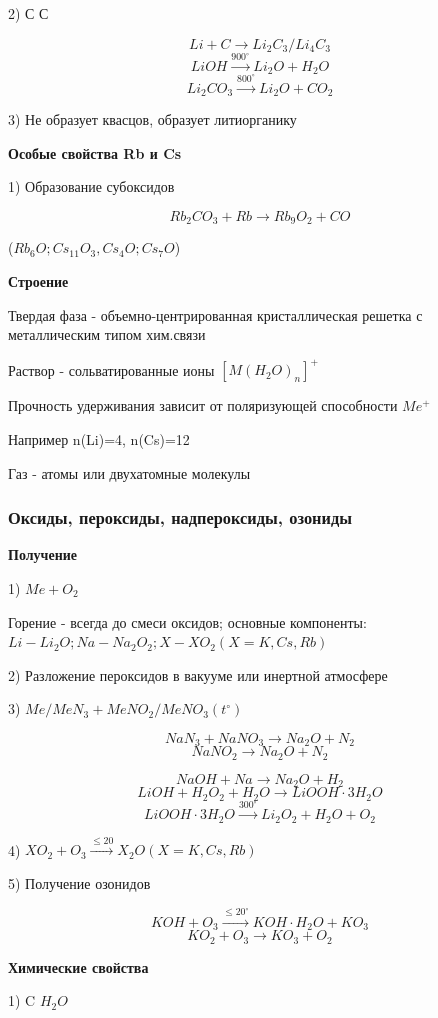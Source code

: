 2) С $С$

$$Li + C \rightarrow Li_2C_3 / Li_4C_3$$
$$LiOH \xrightarrow{900^{\circ}} Li_2O + H_2O$$
$$Li_2CO_3 \xrightarrow{800^{\circ}} Li_2O + CO_2$$

3) Не образует квасцов, образует литиорганику

\textbf{Особые свойства Rb и Cs }

1) Образование субоксидов

$$Rb_2CO_3 + Rb \rightarrow Rb_9O_2 + CO$$

($Rb_6O; Cs_{11}O_3, Cs_4O; Cs_7O$)

\textbf{Строение}

Твердая фаза - объемно-центрированная кристаллическая решетка с металлическим типом хим.связи

Раствор - сольватированные ионы $[M(H_2O)_n]^+$

Прочность удерживания зависит от поляризующей способности $Me^+$

Например n(Li)=4, n(Cs)=12

Газ - атомы или двухатомные молекулы

\subsubsection*{Оксиды, пероксиды, надпероксиды, озониды}

\textbf{Получение}

1) $Me+ O_2$

Горение - всегда до смеси оксидов; основные компоненты:\\
$Li - Li_2O; Na - Na_2O_2; X-XO_2(X= K, Cs, Rb)$

2) Разложение пероксидов в вакууме или инертной атмосфере

3) $Me/MeN_3 + MeNO_2/MeNO_3 (t^{\circ})$

$$NaN_3 + NaNO_3 \rightarrow Na_2O + N_2$$
$$NaNO_2 \rightarrow Na_2O + N_2$$

$$NaOH + Na \rightarrow Na_2O + H_2$$
$$LiOH + H_2O_2 + H_2O \rightarrow LiOOH\cdot 3H_2O$$
$$LiOOH\cdot 3H_2O \xrightarrow{300^{\circ}} Li_2O_2 + H_2O + O_2$$

4) $XO_2 + O_3 \xrightarrow{\leq 20} X_2O (X= K, Cs, Rb)$

5) Получение озонидов

$$KOH + O_3 \xrightarrow{\leq 20^{\circ}} KOH\cdot H_2O + KO_3$$
$$KO_2 + O_3 \rightarrow KO_3 + O_2$$

\textbf{Химические свойства}

1) C $H_2O$


